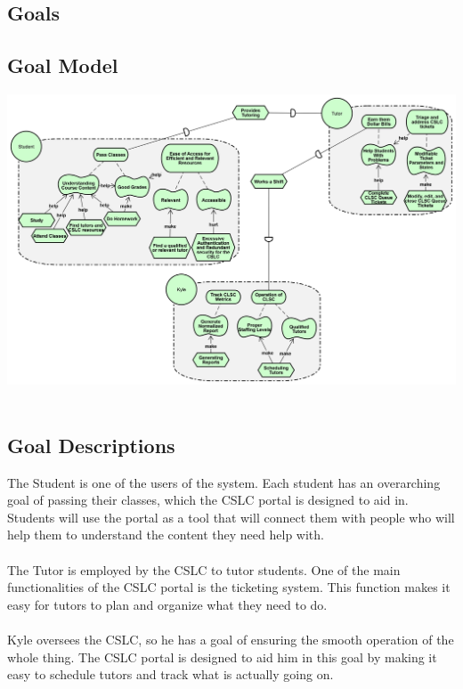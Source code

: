 \documentclass[oneside,openany,obeyspaces]{book}
\newcommand\tab[1][1cm]{\hspace*{#1}}
\begin{document}
\begin{flushleft}
    \section{Goals}

    \subsection{Goal Model}

    \includegraphics[width=160mm,scale=0.5]{img/goalDiagram-New.png}\\~\\

    \subsection{Goal Descriptions}

    \tab The Student is one of the users of the system. Each student has an overarching goal of passing their classes, which the CSLC portal is designed to aid in. Students will use the portal as a tool that will connect them with people who will help them to understand the content they need help with.\\~\\

    \tab The Tutor is employed by the CSLC to tutor students. One of the main functionalities of the CSLC portal is the ticketing system. This function makes it easy for tutors to plan and organize what they need to do.\\~\\

    \tab Kyle oversees the CSLC, so he has a goal of ensuring the smooth operation of the whole thing. The CSLC portal is designed to aid him in this goal by making it easy to schedule tutors and track what is actually going on.\\~\\



\end{flushleft}
\end{document}
